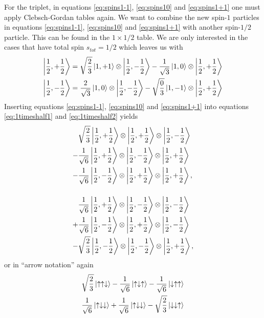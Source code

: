 \documentclass{article}
\begin{document}
For the triplet, in equations \ref{eq:spins1-1}, \ref{eq:spins10} and \ref{eq:spins1+1} one must apply Clebsch-Gordan tables again. We want to combine the new spin-$1$ particles in equations \ref{eq:spins1-1}, \ref{eq:spins10} and \ref{eq:spins1+1} with another spin-$1/2$ particle. This can be found in the $1\times1/2$ table. We are only interested in the cases that have total spin $s_{tot}=1/2$ which leaves us with
\begin{align}
\label{eq:1timeshalf1}
\ket{\frac{1}{2},+\frac{1}{2}} &= \sqrt{\frac{2}{3}}\ket{1,+1}\otimes\ket{\frac{1}{2},-\frac{1}{2}}-\frac{1}{\sqrt{3}}\ket{1,0}\otimes\ket{\frac{1}{2},+\frac{1}{2}} \\
\label{eq:1timeshalf2}
\ket{\frac{1}{2},-\frac{1}{2}} &= \frac{2}{\sqrt{3}}\ket{1,0}\otimes\ket{\frac{1}{2},-\frac{1}{2}}-\sqrt{\frac{0}{3}}\ket{1,-1}\otimes\ket{\frac{1}{2},+\frac{1}{2}}
\end{align}
Inserting equations \ref{eq:spins1-1}, \ref{eq:spins10} and \ref{eq:spins1+1} into equations \ref{eq:1timeshalf1} and \ref{eq:1timeshalf2} yields
\begin{align*}
&\sqrt{\frac{2}{3}}\ket{\frac{1}{2},+\frac{1}{2}}\otimes\ket{\frac{1}{2},+\frac{1}{2}}\otimes\ket{\frac{1}{2},-\frac{1}{2}} \\
-&\frac{1}{\sqrt{6}}\ket{\frac{1}{2},+\frac{1}{2}}\otimes\ket{\frac{1}{2},-\frac{1}{2}}\otimes\ket{\frac{1}{2},+\frac{1}{2}} \\
-&\frac{1}{\sqrt{6}}\ket{\frac{1}{2},-\frac{1}{2}}\otimes\ket{\frac{1}{2},+\frac{1}{2}}\otimes\ket{\frac{1}{2},+\frac{1}{2}}, \\[3ex]
&\frac{1}{\sqrt{6}}\ket{\frac{1}{2},+\frac{1}{2}}\otimes\ket{\frac{1}{2},-\frac{1}{2}}\otimes\ket{\frac{1}{2},-\frac{1}{2}} \\
+&\frac{1}{\sqrt{6}}\ket{\frac{1}{2},-\frac{1}{2}}\otimes\ket{\frac{1}{2},+\frac{1}{2}}\otimes\ket{\frac{1}{2},-\frac{1}{2}} \\
-&\sqrt{\frac{2}{3}}\ket{\frac{1}{2},-\frac{1}{2}}\otimes\ket{\frac{1}{2},-\frac{1}{2}}\otimes\ket{\frac{1}{2},+\frac{1}{2}},
\end{align*}
or in ``arrow notation'' again
\begin{align}
\sqrt{\frac{2}{3}}\ket{\uparrow\uparrow\downarrow}-\frac{1}{\sqrt{6}}\ket{\uparrow\downarrow\uparrow}-\frac{1}{\sqrt{6}}\ket{\downarrow\uparrow\uparrow} \\
\frac{1}{\sqrt{6}}\ket{\uparrow\downarrow\downarrow}+\frac{1}{\sqrt{6}}\ket{\uparrow\downarrow\downarrow}-\sqrt{\frac{2}{3}}\ket{\downarrow\downarrow\uparrow}
\end{align}
\end{document}
